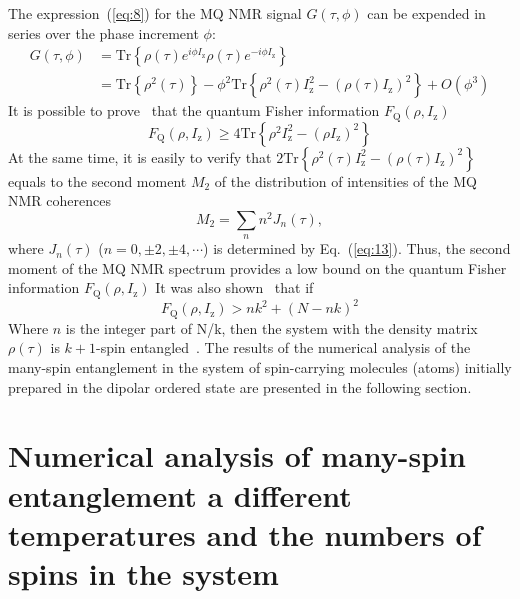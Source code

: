 \documentclass[review]{elsarticle}
\begin{document}
The expression~(\ref{eq:8}) for the MQ NMR signal $G(\tau,\phi)$ can be expended in series over the phase increment $\phi$:
%
\begin{equation}
    \begin{split}
        \label{eq:17}
        G(\tau,\phi)  
        & = \mathrm{Tr} \left\{ 
            \rho(\tau) e^{i \phi I_\mathrm{z} }
            \rho(\tau) e^{-i\phi I_\mathrm{z}}
        \right\}  \\
        & = \mathrm{Tr} \left\{ \rho^2(\tau) \right\} 
        - \phi^2 \mathrm{Tr} \left\{ 
            \rho^2(\tau) I^2_\mathrm{z} 
            - (\rho(\tau) I_\mathrm{z})^2
        \right\} 
        + O(\phi^3)
    \end{split}
\end{equation}
%
It is possible to prove~\cite{Girolami_2017} that the quantum Fisher information $F_\mathrm{Q}(\rho,I_\mathrm{z})$~\cite{Helstrom_1969}
%
\begin{equation}
    \label{eq:18}
    F_\mathrm{Q}(\rho,I_\mathrm{z}) \geq 4 \mathrm{Tr} \left\{ \rho^2 I^2_\mathrm{z} - (\rho I_\mathrm{z})^2 \right\}
\end{equation}
%
At the same time, it is easily to verify that $2 \mathrm{Tr} \left\{ \rho^2(\tau) I_\mathrm{z}^2 - \left( \rho(\tau) I_\mathrm{z} \right)^2 \right\}$ equals to the second moment $M_2$ of the distribution of intensities of the MQ NMR coherences~\cite{Khitrin_1997}
%
\begin{equation}
    \label{eq:19}
    M_2 = \sum_{n} n^2 J_n (\tau) ,
\end{equation}
%
where $J_n(\tau)$ ($n=0,\pm 2, \pm 4, \cdots$) is determined by Eq.~(\ref{eq:13}).
Thus, the second moment of the MQ NMR spectrum provides a low bound on the quantum Fisher information $F_\mathrm{Q}(\rho,I_\mathrm{z})$
It was also shown~\cite{T_th_2014,Pezz__2018} that if
%
\begin{equation}
    \label{eq:20}
    F_\mathrm{Q} (\rho,I_\mathrm{z}) > n k^2 + (N - n k)^2
\end{equation}
%
Where $n$ is the integer part of {N/k}, then the system with the density matrix $\rho(\tau)$ is $k+1$-spin entangled~\cite{Pezz__2009,Hyllus_2012,T_th_2012}.
The results of the numerical analysis of the many-spin entanglement in the system of spin-carrying molecules (atoms) initially prepared in the dipolar ordered state are presented in the following section.



\section{Numerical analysis of many-spin entanglement a different temperatures and the numbers of spins in the system}
\label{sec:5}
\end{document}
